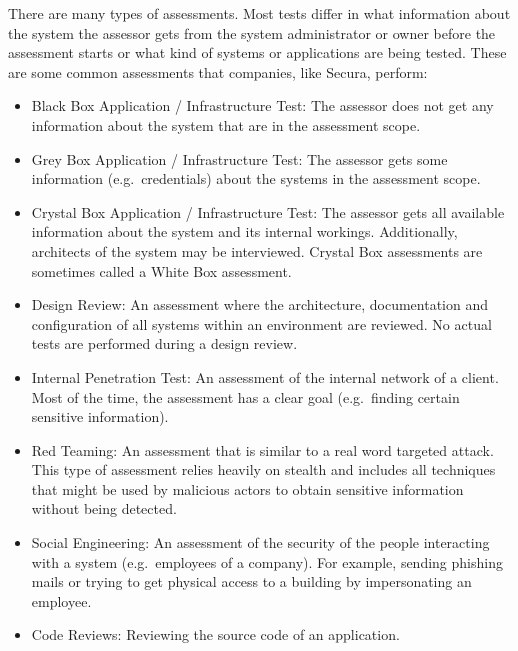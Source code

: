 There are many types of assessments. Most tests differ in what information about the system the assessor gets from the system administrator or owner before the assessment starts or what kind of systems or applications are being tested. These are some common assessments that companies, like Secura, perform:
\begin{itemize}
    \item Black Box Application / Infrastructure Test: The assessor does not get any information about the system that are in the assessment scope.

    \item Grey Box Application / Infrastructure Test: The assessor gets some information (e.g.\ credentials) about the systems in the assessment scope.

    \item Crystal Box Application / Infrastructure Test:  The assessor gets all available information about the system and its internal workings. Additionally, architects of the system may be interviewed. Crystal Box assessments are sometimes called a White Box assessment.

    \item Design Review: An assessment where the architecture, documentation and configuration of all systems within an environment are reviewed. No actual tests are performed during a design review.
    \item Internal Penetration Test: An assessment of the internal network of a client. Most of the time, the assessment has a clear goal (e.g.\ finding certain sensitive information).

    \item Red Teaming: An assessment that is similar to a real word targeted attack. This type of assessment relies heavily on stealth and includes all techniques that might be used by malicious actors to obtain sensitive information without being detected.

    \item Social Engineering: An assessment of the security of the people interacting with a system (e.g.\ employees of a company). For example, sending phishing mails or trying to get physical access to a building by impersonating an employee.

    \item Code Reviews: Reviewing the source code of an application.
\end{itemize}
